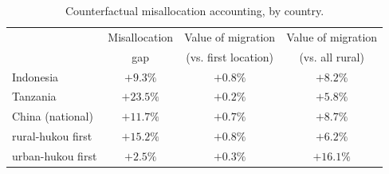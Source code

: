 \begin{table}[htbp]
\centering
\caption{Counterfactual misallocation accounting, by country.}
\label{tab:counterfactual_misallocation_varB}
\begin{tabular}{lccc}
\toprule
 & Misallocation & Value of migration & Value of migration \\
 & gap & (vs. first location) & (vs. all rural) \\
\midrule
Indonesia & $+9.3\%$ & $+0.8\%$ & $+8.2\%$ \\
Tanzania & $+23.5\%$ & $+0.2\%$ & $+5.8\%$ \\
China (national) & $+11.7\%$ & $+0.7\%$ & $+8.7\%$ \\
\quad rural-hukou first & $+15.2\%$ & $+0.8\%$ & $+6.2\%$ \\
\quad urban-hukou first & $+2.5\%$ & $+0.3\%$ & $+16.1\%$ \\
\bottomrule
\end{tabular}
\par{}
\end{table}
